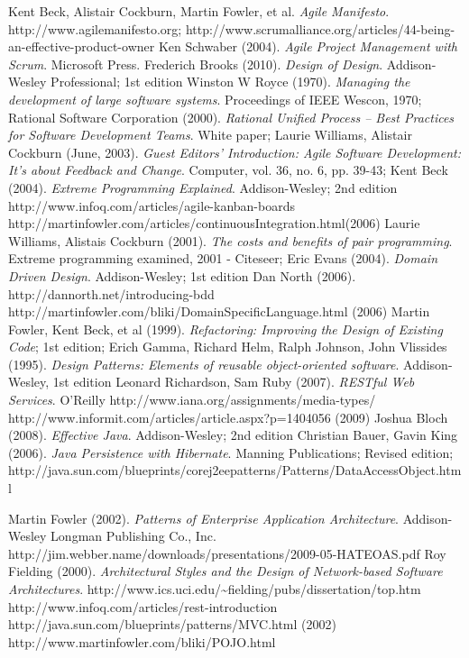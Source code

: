 \begin{thebibliography}{30} 

 Kent Beck, Alistair Cockburn, Martin Fowler, et al. \textit{Agile Manifesto}. http://www.agilemanifesto.org;
 http://www.scrumalliance.org/articles/44-being-an-effective-product-owner
 Ken Schwaber (2004). \textit{Agile Project Management with Scrum}. Microsoft Press.
 Frederich Brooks (2010). \textit{Design of Design}. Addison-Wesley Professional; 1st edition
 Winston W Royce (1970). \textit{Managing the development of large software systems}.
Proceedings of IEEE Wescon, 1970;
 Rational Software Corporation (2000). \textit{Rational Unified Process -- Best Practices for Software Development Teams}. White paper;
 Laurie Williams, Alistair Cockburn (June, 2003). \textit{Guest Editors' Introduction: Agile Software Development: It's about Feedback and Change}. Computer, vol. 36, no. 6, pp. 39-43;
 Kent Beck (2004). \textit{Extreme Programming Explained}. Addison-Wesley; 2nd edition
 http://www.infoq.com/articles/agile-kanban-boards
 http://martinfowler.com/articles/continuousIntegration.html(2006)
 Laurie Williams, Alistais Cockburn (2001). \textit{The costs and benefits of pair programming}. Extreme programming examined, 2001 - Citeseer;
 Eric Evans (2004). \textit{Domain Driven Design}. Addison-Wesley; 1st edition
 Dan North (2006). http://dannorth.net/introducing-bdd
 http://martinfowler.com/bliki/DomainSpecificLanguage.html (2006)
 Martin Fowler, Kent Beck, et al (1999). \textit{Refactoring: Improving the Design of Existing Code}; 1st edition;
 Erich Gamma, Richard Helm, Ralph Johnson, John Vlissides (1995). \textit{Design Patterns: Elements of reusable object-oriented software}. Addison-Wesley, 1st edition
 Leonard Richardson, Sam Ruby (2007). \textit{RESTful Web Services}. O'Reilly
 http://www.iana.org/assignments/media-types/
 http://www.informit.com/articles/article.aspx?p=1404056 (2009)
 Joshua Bloch (2008). \textit{Effective Java}. Addison-Wesley; 2nd edition
 Christian Bauer, Gavin King (2006). \textit{Java Persistence with Hibernate}. Manning Publications; Revised edition;
 http://java.sun.com/blueprints/corej2eepatterns/Patterns/DataAccessObject.html

 Martin Fowler (2002). \textit{Patterns of Enterprise Application Architecture}.  Addison-Wesley Longman Publishing Co., Inc.
 http://jim.webber.name/downloads/presentations/2009-05-HATEOAS.pdf
 Roy Fielding (2000). \textit{Architectural Styles and the Design of Network-based Software Architectures}. http://www.ics.uci.edu/\~{}fielding/pubs/dissertation/top.htm
 http://www.infoq.com/articles/rest-introduction
 http://java.sun.com/blueprints/patterns/MVC.html (2002)
 http://www.martinfowler.com/bliki/POJO.html
\end{thebibliography}
